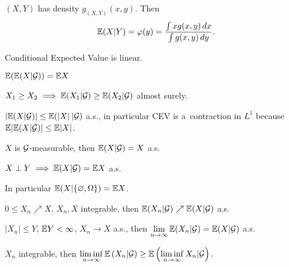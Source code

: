 



	\begin{example}
		$(X, Y)$ has density $g_{(X,Y)}(x,y)$.
		Then $$\mathbb{E}(X|Y) = \varphi(y) = \frac{\int x g(x,y)\,dx}{\int g(x,y)\,dy}.$$
	\end{example}
	
	\begin{proposition}
		Conditional Expected Value is linear.
	\end{proposition}
	
	\begin{proposition}
		$\mathbb{E}(\mathbb{E}(X | \mathcal{G})) = \mathbb{E} X$
	\end{proposition}
	
	\begin{proposition}
		$X_1 \geq X_2 \implies \mathbb{E}(X_1 | \mathcal{G}) \geq \mathbb{E}(X_2 | \mathcal{G})$ almost surely.
	\end{proposition}
	
	\begin{proposition}
		$|\mathbb{E}(X | \mathcal{G}) | \leq \mathbb{E}(|X|\: | \mathcal{G})$ a.s.,
		in particular CEV is a~contraction in $L^1$
		because $\mathbb{E}| \mathbb{E}(X | \mathcal{G}) | \leq \mathbb{E} |X|$.
	\end{proposition}

	
	\begin{proposition}
		$X$ is $\mathcal{G}$-measurable, then $\mathbb{E}(X|\mathcal{G}) = X$ a.s.
	\end{proposition}
	
	\begin{proposition}
		$X \perp Y \implies \mathbb{E}(X | \mathcal{G}) = \mathbb{E} X$ a.s.
		
		In particular $\mathbb{E}(X | \{ \varnothing, \Omega\}) = \mathbb{E} X$.
	\end{proposition}
	
	\begin{proposition}
		$0 \leq X_n \nearrow X$, $X_n, X$ integrable,
		then $\mathbb{E}(X_n | \mathcal{G}) \nearrow \mathbb{E}(X|\mathcal{G})$ a.s.
	\end{proposition}
	
	\begin{proposition}
		$|X_n| \leq Y$, $\mathbb{E} Y < \infty$, $X_n \to X$ a.s.,
		then $\displaystyle \lim_{n \to \infty} \mathbb{E}(X_n | \mathcal{G}) = \mathbb{E}(X | \mathcal{G})$ a.s.
	\end{proposition}
	
	\begin{proposition}
		$X_n$ integrable, then $\displaystyle \liminf_{n \to \infty}
		\mathbb{E}\left(X_n | \mathcal{G}\right)
		\geq \mathbb{E}\left(\liminf_{n \to \infty} X_n | \mathcal{G}\right).$
	\end{proposition}
	
